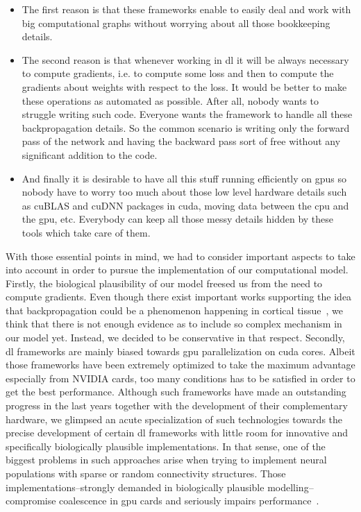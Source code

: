 \documentclass[11pt,a4paper]{article}
\begin{document}
\begin{itemize}
	\item The first reason is that these frameworks enable to easily deal and work with big computational graphs without worrying about all those bookkeeping details.
	\item The second reason is that whenever working in \gls{dl} it will be always necessary to compute gradients, i.e. to compute some loss and then to compute the gradients about weights with respect to the loss. It would be better to make these operations as automated as possible. After all, nobody wants to struggle writing such code. Everyone wants the framework to handle all these backpropagation details. So the common scenario is writing only the forward pass of the network and having the backward pass sort of free without any significant addition to the code.
	\item And finally it is desirable to have all this stuff running efficiently on \glspl{gpu} so nobody have to worry too much about those low level hardware details such as cuBLAS and cuDNN packages in \gls{cuda}, moving data between the \gls{cpu} and the \gls{gpu}, etc. Everybody can keep all those messy details hidden by these tools which take care of them.
\end{itemize}

With those essential points in mind, we had to consider important aspects to take into account in order to pursue the implementation of our computational model. Firstly, the biological plausibility of our model freesed us from the need to compute gradients. Even though there exist important works supporting the idea that backpropagation could be a phenomenon happening in cortical tissue~\cite{Guerguiev2017TowardsDL}, we think that there is not enough evidence as to include so complex mechanism in our model yet. Instead, we decided to be conservative in that respect. Secondly, \gls{dl} frameworks are mainly biased towards \gls{gpu} parallelization on \gls{cuda} cores. Albeit those frameworks have been extremely optimized to take the maximum advantage especially from NVIDIA cards, too many conditions has to be satisfied in order to get the best performance. Although such frameworks have made an outstanding progress in the last years together with the development of their complementary hardware, we glimpsed an acute specialization of such technologies towards the precise development of certain \gls{dl} frameworks with little room for innovative and specifically biologically plausible implementations. In that sense, one of the biggest problems in such approaches arise when trying to implement neural populations with sparse or random connectivity structures. Those implementations--strongly demanded in biologically plausible modelling--compromise coalescence in \gls{gpu} cards and seriously impairs performance~\cite{doi:10.3109/0954898X.2012.739292}.
\end{document}
